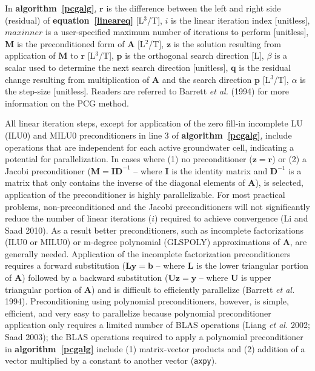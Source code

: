 \documentclass[12pt]{article}
\begin{document}
In \textbf{algorithm~\ref{pcgalg}}, $\mathbf{r}$ is the \color{cyan}difference between the left and right side (residual) \color{black}of \textbf{equation~\ref{lineareq}} [L$^3$/T], $i$ is the linear iteration index [unitless], $maxinner$ is a user-specified maximum number of iterations to perform [unitless], $\mathbf{M}$ is the preconditioned form of $\mathbf{A}$ [L$^2$/T], $\mathbf{z}$ is the solution resulting from application of $\mathbf{M}$ to $\mathbf{r}$ [L$^3$/T], $\mathbf{p}$ is the orthogonal search direction [L], $\beta$ is a scalar used to determine the next search direction [unitless], $\mathbf{q}$ is the residual change resulting from multiplication of $\mathbf{A}$ and the search direction $\mathbf{p}$ [L$^3$/T], $\alpha$ is the step-size [unitless]. \color{cyan}Readers are referred to Barrett \textit{et al.} (1994) for more information on the PCG method.\color{black}

All linear iteration steps, except for application of the zero fill-in incomplete LU (ILU0) and MILU0 preconditioners in line 3 of \textbf{algorithm~\ref{pcgalg}}, include operations that are independent for each active groundwater cell, indicating a potential for parallelization. In cases where (1) no preconditioner ($\mathbf{z = r}$) or (2) a Jacobi preconditioner ($\mathbf{M = I D}^{-1}$ -- where $\mathbf{I}$ is the identity matrix and $\mathbf{D}^{-1}$ is a matrix that only contains the inverse of the diagonal elements of $\mathbf{A}$), is selected, application of the preconditioner is highly parallelizable. For most practical problems, non-preconditioned and the Jacobi preconditioners will not significantly reduce the number of linear iterations ($i$) required to achieve convergence (Li and Saad 2010). As a result better preconditioners, such as incomplete factorizations (ILU0 or MILU0) or m-degree polynomial (GLSPOLY) approximations of $\mathbf{A}$, are generally needed. Application of the incomplete factorization preconditioners requires a forward substitution ($\mathbf{Ly = b}$ -- where $\mathbf{L}$ is the lower triangular portion of $\mathbf{A}$) followed by a backward substitution ($\mathbf{Uz = y}$ – where $\mathbf{U}$ is upper triangular portion of $\mathbf{A}$) and is difficult to efficiently parallelize (Barrett \textit{et al.} 1994). Preconditioning using polynomial preconditioners, however, is simple, efficient, and very easy to parallelize \color{cyan}because polynomial preconditioner application only requires a limited number of  BLAS operations (Liang \textit{et al.} 2002; Saad 2003); the BLAS operations required to apply a polynomial preconditioner in \textbf{algorithm~\ref{pcgalg}} include (1) matrix-vector products and (2) addition of a vector multiplied by a constant to another vector (\texttt{axpy}).\color{black}
\end{document}
